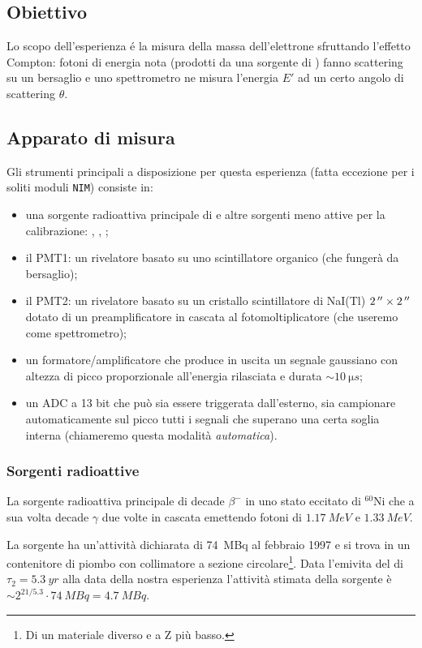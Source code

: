 \subsection{Obiettivo}
Lo scopo dell'esperienza é la misura della massa dell'elettrone sfruttando l'effetto Compton: fotoni di energia nota (prodotti da una sorgente di \co) fanno scattering su un bersaglio e uno spettrometro ne misura l'energia $E'$ ad un certo angolo di scattering $\theta$.

\subsection{Apparato di misura}
Gli strumenti principali a disposizione per questa esperienza (fatta eccezione per i soliti moduli \texttt{NIM}) consiste in:
\begin{itemize}
	\item una sorgente radioattiva principale di \co\! e altre sorgenti meno attive per la calibrazione: \cs, \na, \am;
	\item il PMT1: un rivelatore basato su uno scintillatore organico (che fungerà da bersaglio);
	\item il PMT2: un rivelatore basato su un cristallo scintillatore di NaI(Tl) $\SI2{''}\times\SI2{''}$ dotato di un preamplificatore in cascata al fotomoltiplicatore (che useremo come spettrometro);
	\item un formatore/amplificatore che produce in uscita un segnale gaussiano con altezza di picco proporzionale all'energia rilasciata e durata $\sim \SI{10}{\micro s}$;
	\item un ADC a 13 bit che può sia essere triggerata dall'esterno, sia campionare automaticamente sul picco tutti i segnali che superano una certa soglia interna (chiameremo questa modalità \emph{automatica}).
\end{itemize}

\subsubsection{Sorgenti radioattive}
La sorgente radioattiva principale di \co\; decade $\beta^-$ in uno stato eccitato di $^{60}$Ni che a sua volta decade $\gamma$ due volte in cascata emettendo fotoni di $\SI{1.17}{MeV}$ e $\SI{1.33}{MeV}$.

La sorgente ha un'attività dichiarata di \SI{74}{MBq} al febbraio 1997 e si trova in un contenitore di piombo con collimatore a sezione circolare\footnote{Di un materiale diverso e a Z più basso.}. 
Data l'emivita del \co\; di $\tau_2 = \SI{5.3}{yr}$ alla data della nostra esperienza l'attività stimata della sorgente è $\sim 2^{21/5.3} \cdot \SI{74}{MBq} = \SI{4.7}{MBq}$.

